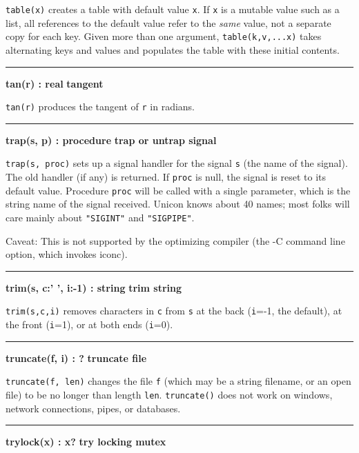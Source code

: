 \noindent
{}\texttt{table(x)} creates a table with default value
\texttt{x}. If \texttt{x} is a mutable value such as a list, all
references to the default value refer to the \textit{same} value, not a
separate copy for each key. Given more than one argument,
\texttt{table(k,v,...x)} takes alternating keys and values and
populates the table with these initial contents.

\bigskip\hrule\vspace{0.1cm}
\noindent
{\bf tan(r) : real } \hfill {\bf tangent}

\noindent
{}\texttt{tan(r)} produces the tangent of \texttt{r} in
radians.

\bigskip\hrule\vspace{0.1cm}
\noindent
{\bf trap(s, p) : procedure } \hfill {\bf trap or untrap signal}

\noindent
{}\texttt{trap(s, proc)} sets up a signal handler for
the signal \texttt{s} (the name of the signal). The old handler (if
any) is returned. If \texttt{proc} is null, the signal is reset to its
default value. Procedure \texttt{proc} will be called with a single parameter,
which is the string name of the signal received. Unicon knows about 40
names; most folks will care mainly about
\texttt{"SIGINT"} and \texttt{"SIGPIPE"}.

Caveat: This is not supported by the optimizing
compiler (the -C command line option, which invokes iconc).

\bigskip\hrule\vspace{0.1cm}
\noindent
{\bf trim(s, c:' ', i:{}-1) : string } \hfill {\bf trim string}

\noindent
{}\texttt{trim(s,c,i)} removes characters in \texttt{c}
from \texttt{s} at the back (\texttt{i}=-1, the default), at the front
(\texttt{i}=1), or at both ends (\texttt{i}=0).

\bigskip\hrule\vspace{0.1cm}
\noindent
{\bf truncate(f, i) : ? } \hfill {\bf truncate file}

\noindent
{}\texttt{truncate(f, len)} changes the file
\texttt{f} (which may be a string filename, or an open file) to be no
longer than length \texttt{len}. \texttt{truncate()} does not work on
windows, network connections, pipes, or databases.

\bigskip\hrule\vspace{0.1cm}
\noindent
{\bf trylock(x) : x? } \hfill {\bf try locking mutex}

